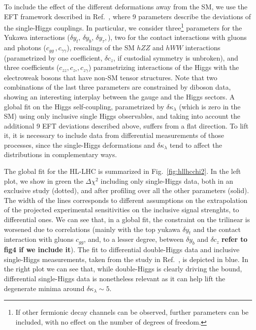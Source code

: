 To include the effect of the different deformations away from the SM, we use the EFT framework described in Ref.~\cite{DiVita:2017eyz}, where 9 parameters describe the deviations of the single-Higgs couplings. In particular, we consider three\footnote{If other fermionic decay channels can be observed, further parameters can be included, with no effect on the number of degrees of freedom.} parameters for the Yukawa interactions ($\delta y_t,\,\delta y_b,\,\delta y_\tau,$), two for the contact interactions with gluons and photons ($c_{gg}\,,c_{\gamma\gamma}$), rescalings of the SM $hZZ$ and $hWW$ interactions (parametrized by one coefficient, $\delta c_z$, if custodial symmetry is unbroken), and three coefficients ($c_{zz},c_{z\square},c_{z\gamma}$) parametrizing interactions of the Higgs with the electroweak bosons that have non-SM tensor structures. Note that two combinations of the last three parameters are constrained by diboson data, showing an interesting interplay between the gauge and the Higgs sectors. A global fit on the Higgs self-coupling, parametrized by $\delta\kappa_\lambda$ (which is zero in the SM) using only inclusive single Higgs observables, and taking into account the additional 9 EFT deviations described above, suffers from a flat direction. To lift it, it is necessary to include data from differential measurements of those processes, since the single-Higgs deformations and $\delta\kappa_\lambda$ tend to affect the distributions in complementary ways.
\medskip

The global fit for the HL-LHC is summarized in Fig.~\ref{fig:hllhcchi2}. In the left plot, we show in green the $\Delta\chi^2$ including only single-Higgs data, both in an exclusive study (dotted), and after profiling over all the other parameters (solid). The width of the lines corresponds to different assumptions on the extrapolation of the projected experimental sensitivities on the inclusive signal strenghts, to differential ones. We can see that, in a global fit, the constraint on the trilinear is worsened due to correlations (mainly with the top yukawa $\delta y_t$ and the contact interaction with gluons $c_{gg}$, and, to a lesser degree, between $\delta y_b$ and $\delta c_z$ \textbf{refer to fig4 if we include it}). The fit to differential double-Higgs data and inclusive single-Higgs measurements, taken from the study in Ref.~\cite{Azatov:2015oxa}, is depicted in blue. In the right plot we can see that, while double-Higgs is clearly driving the bound, differential single-Higgs data is nonetheless relevant as it can help lift the degenerate minima around $\delta \kappa_\lambda\sim 5$.
\medskip


